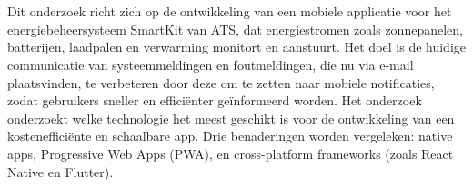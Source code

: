 
%
%
%
%
%

%



\chapter*{}

Dit onderzoek richt zich op de ontwikkeling van een mobiele applicatie voor het energiebeheersysteem SmartKit van ATS, dat energiestromen zoals zonnepanelen, batterijen, laadpalen en verwarming monitort en aanstuurt. Het doel is de huidige communicatie van systeemmeldingen en foutmeldingen, die nu via e-mail plaatsvinden, te verbeteren door deze om te zetten naar mobiele notificaties, zodat gebruikers sneller en efficiënter geïnformeerd worden. Het onderzoek onderzoekt welke technologie het meest geschikt is voor de ontwikkeling van een kostenefficiënte en schaalbare app. Drie benaderingen worden vergeleken: native apps, Progressive Web Apps (PWA), en cross-platform frameworks (zoals React Native en Flutter). \\

